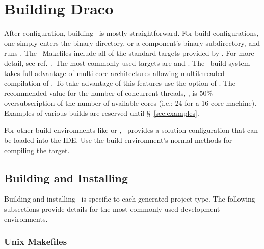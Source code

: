 \section{Building Draco}
\label{sec:building_draco}

After configuration, building \draco\ is mostly straightforward.  For   build configurations, 
one simply enters the binary directory, or a component's binary
subdirectory, and runs \gmake.  The \draco\ Makefiles include all of
the standard targets provided by \cmake.  For more detail, see ref.~\cite{cmake}. The most commonly used targets are  and .  
The \draco\ build system takes full advantage of multi-core architectures allowing multithreaded compilation of \draco.  
To take advantage of this features use the  option of \gmake.  The recommended value for the number of concurrent threads, 
, is 50\% oversubscription of the number of available cores (i.e.: 24 for a 16-core machine). Examples of various builds are reserved
until \S~\ref{sec:examples}.

For other build environments like  or , \cmake\ provides a solution configuration that can be loaded into the IDE.  Use the 
build environment's normal methods for compiling the  target.

\subsection{Building and Installing}

Building and installing \draco\ is specific to each generated project type.  The following subsections provide details for the most commonly used development environments.

\subsubsection{Unix Makefiles}

